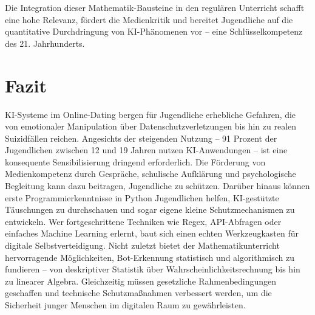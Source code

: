 \documentclass[12pt,a4paper,oneside]{scrartcl}
\begin{document}
	Die Integration dieser Mathematik-Bausteine in den regulären Unterricht schafft eine hohe Relevanz, fördert die Medienkritik und bereitet Jugendliche auf die quantitative Durchdringung von KI-Phänomenen vor – eine Schlüsselkompetenz des 21. Jahrhunderts.
	
	\section{Fazit}
	
	KI-Systeme im Online-Dating bergen für Jugendliche erhebliche Gefahren, die von emotionaler Manipulation über Datenschutzverletzungen bis hin zu realen Suizidfällen reichen. Angesichts der steigenden Nutzung – 91 Prozent der Jugendlichen zwischen 12 und 19 Jahren nutzen KI-Anwendungen \cite{JIM2025} – ist eine konsequente Sensibilisierung dringend erforderlich. Die Förderung von Medienkompetenz durch Gespräche, schulische Aufklärung und psychologische Begleitung kann dazu beitragen, Jugendliche zu schützen. Darüber hinaus können erste Programmierkenntnisse in Python Jugendlichen helfen, KI-gestützte Täuschungen zu durchschauen und sogar eigene kleine Schutzmechanismen zu entwickeln. Wer fortgeschrittene Techniken wie Regex, API-Abfragen oder einfaches Machine Learning erlernt, baut sich einen echten Werkzeugkasten für digitale Selbstverteidigung. Nicht zuletzt bietet der Mathematikunterricht hervorragende Möglichkeiten, Bot-Erkennung statistisch und algorithmisch zu fundieren – von deskriptiver Statistik über Wahrscheinlichkeitsrechnung bis hin zu linearer Algebra. Gleichzeitig müssen gesetzliche Rahmenbedingungen geschaffen und technische Schutzmaßnahmen verbessert werden, um die Sicherheit junger Menschen im digitalen Raum zu gewährleisten.
	
\end{document}
